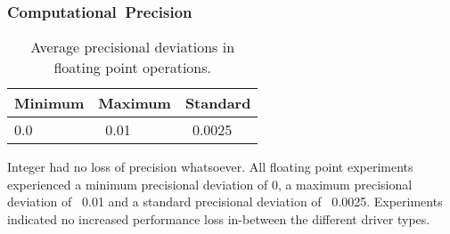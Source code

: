 \documentclass[fleqn,10pt]{SelfArx} %
\begin{document}
\subsubsection{Computational~Precision}
\label{sec:contribution:results:computationalprecision}
\begin{table}
\begin{center}
	\begin{tabular}{|l|l|l|}
		\hline
		Minimum & Maximum & Standard \\ \hline
		0.0     & ~0.01   & ~0.0025            \\ \hline
	\end{tabular}
\label{tab:contribution:results:computationalprecision:avgprecision}
\caption {Average precisional deviations in floating point operations.}
\end{center}
\end{table}

Integer had no loss of precision whatsoever.
All floating point experiments experienced a minimum precisional deviation of 0, a maximum precisional deviation of ~0.01 and a standard precisional deviation of ~0.0025. Experiments indicated no increased performance loss in-between the different driver types.


\end{document}
